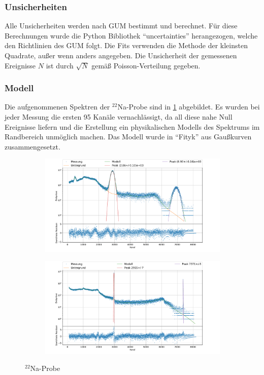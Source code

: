 \documentclass[
	a4paper,
	12pt,
	pagesize,
	ngerman
]{scrartcl}
\begin{document}
	\subsubsection{Unsicherheiten}
	Alle Unsicherheiten werden nach GUM bestimmt und berechnet.
	Für diese Berechnungen wurde die Python Bibliothek \enquote{uncertainties} herangezogen, welche den Richtlinien des GUM folgt.
	Die Fits verwenden die Methode der kleinsten Quadrate, außer wenn anders angegeben.
	Die Unsicherheit der gemessenen Ereignisse $N$ ist durch $\sqrt{N}$ gemäß Poisson-Verteilung gegeben.
	\subsubsection{Modell}
	Die aufgenommenen Spektren der $^{22}$Na-Probe sind in \cref{fg_Na_ch} abgebildet.
	Es wurden bei jeder Messung die ersten 95 Kanäle vernachlässigt, da all diese nahe Null Ereignisse liefern und die Erstellung ein physikalischen Modells des Spektrums im Randbereich unmöglich machen. %
	Das Modell wurde in \enquote{Fityk} aus Gaußkurven zusammengesetzt.
	\begin{figure}[H]
		\centering
		\begin{subfigure}[c]{\textwidth}
			\centering
			\includegraphics[width= 1 \linewidth]{img/NaNaCh.pdf}
		\end{subfigure}
		\begin{subfigure}[c]{\textwidth}
			\centering
			\includegraphics[width= 1 \linewidth]{img/NaGeCh.pdf}
		\end{subfigure}
		\caption{$^{22}$Na-Probe}
		\label{fg_Na_ch}
	\end{figure}
\end{document}
